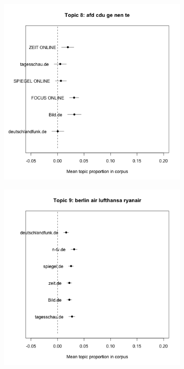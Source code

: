 \documentclass[12pt,a4paper,notitlepage]{article}
\begin{document}
\begin{figure}[H]
\begin{center}
\begin{subfigure}[normla]{0.2\textwidth}
		\end{subfigure}
		\begin{subfigure}[normla]{0.2\textwidth}
			\includegraphics[width=\textwidth]{../figs/estimate_effect8.png}
		\end{subfigure}
		\begin{subfigure}[normla]{0.2\textwidth}
			\includegraphics[width=\textwidth]{../figs/estimate_effect9.png}

\end{subfigure}
\end{center}
\end{figure}
\end{document}
